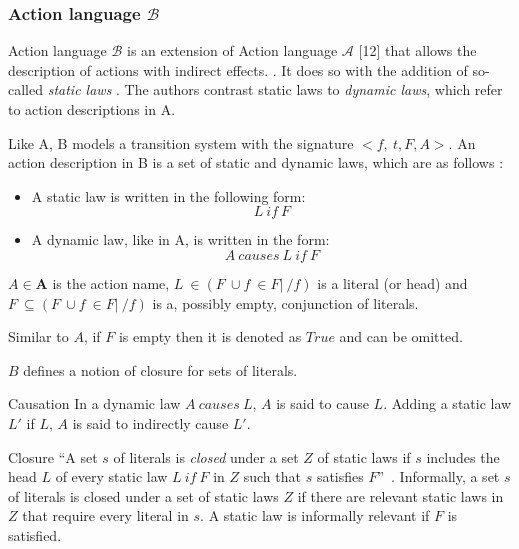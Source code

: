 \subsubsection{Action language $ \mathcal{B} $}
\label{subsubsec:action_language_b}

Action language $ \mathcal{B} $ is an extension of Action language $ \mathcal{A} $ [12] that allows the description of actions with indirect effects.
\cite{gelfond_action_1998}.
It does so with the addition of so-called \textit{static laws} \cite{gelfond_action_1998}.
The authors contrast static laws to \textit{dynamic laws}, which refer to action descriptions in A.

Like A, B models a transition system with the signature $<{f,\ t},F,A>$.
An action description in B is a set of static and dynamic laws, which are as follows \cite{gelfond_action_1998}:

\begin{itemize}
    \item A static law is written in the following form:
        $$
        L\ if\ F
        $$

    \item A dynamic law, like in A, is written in the form:
        $$
        A\ causes\ L\ if\ F
        $$
\end{itemize}

$A \in \boldsymbol{A}$ is the action name, $L\ \in(F\ \cup{f\ \in F|\ /f})$ is a literal (or head) and $F\ \subseteq(F\ \cup{f\ \in F|\ /f})$ is a, possibly empty, conjunction of literals.

Similar to $A$, if $F$ is empty then it is denoted as $True$ and can be omitted.

$B$ defines a notion of closure for sets of literals.

\begin{definition}{Causation}
    In a dynamic law $A \ causes \ L$, $A$ is said to cause $L$.
    Adding a static law $L'$ if $L$, $A$ is said to indirectly cause $L'$.
\end{definition}

\begin{definition}{Closure}
    ``A set $s$ of literals is \textit{closed} under a set $Z$ of static laws if $s$ includes the head $L$ of every static law $L\ if\ F$ in $Z$ such that $s$ satisfies $F$''~\cite{gelfond_action_1998}.
    Informally, a set $s$ of literals is closed under a set of static laws $Z$ if there are relevant static laws in $Z$ that require every literal in $s$.
    A static law is informally relevant if $F$ is satisfied.
\end{definition}

